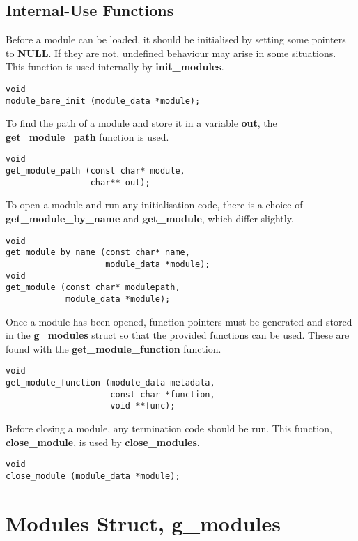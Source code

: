 \documentclass[12pt,a4paper]{article}
\begin{document}
\subsection{Internal-Use Functions}

Before a module can be loaded, it should be initialised by setting some pointers to \textbf{NULL}. If they are not, undefined behaviour may arise in some situations. This function is used internally by \textbf{init\_modules}.

\begin{lstlisting}
void
module_bare_init (module_data *module);
\end{lstlisting}

To find the path of a module and store it in a variable \textbf{out}, the \textbf{get\_module\_path} function is used.

\begin{lstlisting}
void
get_module_path (const char* module,
                 char** out);
\end{lstlisting}

To open a module and run any initialisation code, there is a choice of \textbf{get\_module\_by\_name} and \textbf{get\_module}, which differ slightly.

\begin{lstlisting}
void
get_module_by_name (const char* name,
                    module_data *module);
void
get_module (const char* modulepath,
            module_data *module);
\end{lstlisting}

Once a module has been opened, function pointers must be generated and stored in the \textbf{g\_modules} struct so that the provided functions can be used. These are found with the \textbf{get\_module\_function} function.

\begin{lstlisting}
void
get_module_function (module_data metadata,
                     const char *function,
                     void **func);
\end{lstlisting}

Before closing a module, any termination code should be run. This function, \textbf{close\_module}, is used by \textbf{close\_modules}.

\begin{lstlisting}
void
close_module (module_data *module);
\end{lstlisting}

\section{Modules Struct, g\_modules}
\end{document}
